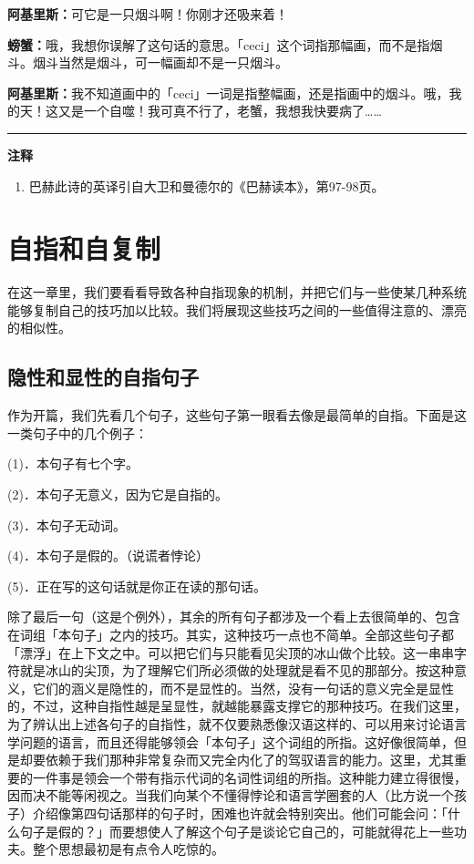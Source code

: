 \documentclass[
  12pt,
  twoside,
  openright,
  oldfontcommands,
]{memoir}
\newcommand{\dialogname}[1]{{\heifamily\bfseries #1}}
\begin{document}
\dialogname{阿基里斯：}可它是一只烟斗啊！你刚才还吸来着！

\dialogname{螃蟹：}哦，我想你误解了这句话的意思。「ceci」这个词指那幅画，而不是指烟斗。烟斗当然是烟斗，可一幅画却不是一只烟斗。

\dialogname{阿基里斯：}我不知道画中的「ceci」一词是指整幅画，还是指画中的烟斗。哦，我的天！这又是一个自噬！我可真不行了，老蟹，我想我快要病了\ldots\ldots{}

{\footnotesize\setlength{\parindent}{0pt}%
\noindent\textcolor{rulegray}{\rule{0.35\linewidth}{0.3pt}}\par\vspace{2pt}
\noindent\textbf{注释}\par\vspace{3pt}
\begin{enumerate}
\label{fn:Dialog16-1}{}
\item 巴赫此诗的英译引自大卫和曼德尔的《巴赫读本》，第97-98页。
\end{enumerate}
}

\label{Chapter16.xhtml}{}

\chapter{自指和自复制}

在这一章里，我们要看看导致各种自指现象的机制，并把它们与一些使某几种系统能够复制自己的技巧加以比较。我们将展现这些技巧之间的一些值得注意的、漂亮的相似性。

\section{隐性和显性的自指句子}

作为开篇，我们先看几个句子，这些句子第一眼看去像是最简单的自指。下面是这一类句子中的几个例子：

(1)．本句子有七个字。

(2)．本句子无意义，因为它是自指的。

(3)．本句子无动词。

(4)．本句子是假的。（说谎者悖论）

(5)．正在写的这句话就是你正在读的那句话。

除了最后一句（这是个例外），其余的所有句子都涉及一个看上去很简单的、包含在词组「本句子」之内的技巧。其实，这种技巧一点也不简单。全部这些句子都「漂浮」在上下文之中。可以把它们与只能看见尖顶的冰山做个比较。这一串串字符就是冰山的尖顶，为了理解它们所必须做的处理就是看不见的那部分。按这种意义，它们的涵义是隐性的，而不是显性的。当然，没有一句话的意义完全是显性的，不过，这种自指性越是呈显性，就越能暴露支撑它的那种技巧。在我们这里，为了辨认出上述各句子的自指性，就不仅要熟悉像汉语这样的、可以用来讨论语言学问题的语言，而且还得能够领会「本句子」这个词组的所指。这好像很简单，但是却要依赖于我们那种非常复杂而又完全内化了的驾驭语言的能力。这里，尤其重要的一件事是领会一个带有指示代词的名词性词组的所指。这种能力建立得很慢，因而决不能等闲视之。当我们向某个不懂得悖论和语言学圈套的人（比方说一个孩子）介绍像第四句话那样的句子时，困难也许就会特别突出。他们可能会问：「什么句子是假的？」而要想使人了解这个句子是谈论它自己的，可能就得花上一些功夫。整个思想最初是有点令人吃惊的。
\end{document}
